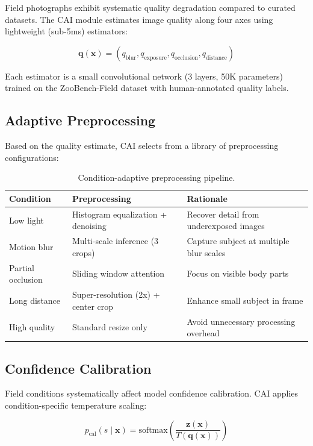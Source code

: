 \documentclass[11pt,a4paper]{article}
\begin{document}
Field photographs exhibit systematic quality degradation compared to curated datasets.
The CAI module estimates image quality along four axes using lightweight (sub-5ms) estimators:

\begin{equation}
    \mathbf{q}(\mathbf{x}) = (q_{\text{blur}}, q_{\text{exposure}}, q_{\text{occlusion}}, q_{\text{distance}})
\end{equation}

Each estimator is a small convolutional network (3 layers, 50K parameters) trained on the ZooBench-Field dataset with human-annotated quality labels.

\subsection{Adaptive Preprocessing}

Based on the quality estimate, CAI selects from a library of preprocessing configurations:

\begin{table}[H]
\centering
\caption{Condition-adaptive preprocessing pipeline.}
\label{tab:preprocessing}
\begin{tabularx}{\textwidth}{@{}llX@{}}
\toprule
\textbf{Condition} & \textbf{Preprocessing} & \textbf{Rationale} \\
\midrule
Low light & Histogram equalization + denoising & Recover detail from underexposed images \\
Motion blur & Multi-scale inference (3 crops) & Capture subject at multiple blur scales \\
Partial occlusion & Sliding window attention & Focus on visible body parts \\
Long distance & Super-resolution (2x) + center crop & Enhance small subject in frame \\
High quality & Standard resize only & Avoid unnecessary processing overhead \\
\bottomrule
\end{tabularx}
\end{table}

\subsection{Confidence Calibration}

Field conditions systematically affect model confidence calibration.
CAI applies condition-specific temperature scaling:

\begin{equation}
    p_{\text{cal}}(s \mid \mathbf{x}) = \text{softmax}\left(\frac{\mathbf{z}(\mathbf{x})}{T(\mathbf{q}(\mathbf{x}))}\right)
\end{equation}
\end{document}
